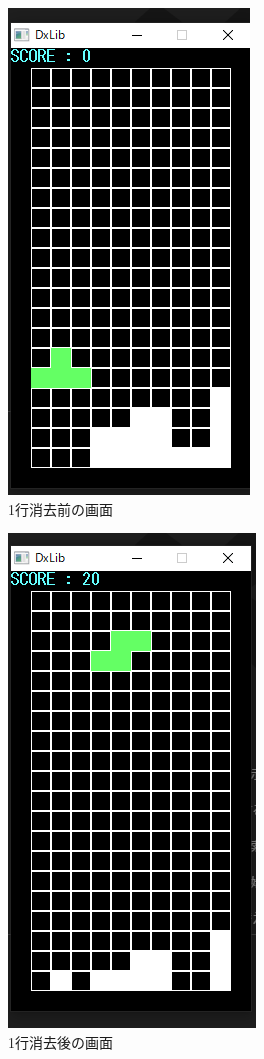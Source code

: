 \begin{figure}[htb]
  \begin{center}
    \includegraphics[scale=0.5]{./soft_img/onelinebefore.png}
    \caption{1行消去前の画面}
    \label{one1}
  \end{center}
\end{figure}
\begin{figure}[htb]
  \begin{center}
    \includegraphics[scale=0.5]{./soft_img/onelineafter.png}
    \caption{1行消去後の画面}
    \label{one2}
  \end{center}
\end{figure}
